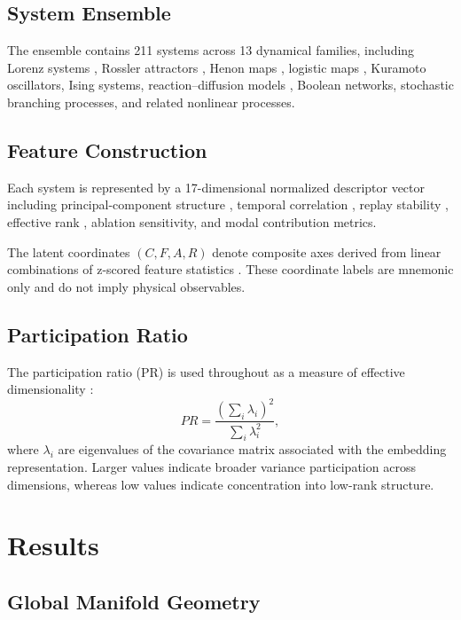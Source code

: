 \documentclass[%
 aip,
 chaos,
 amsmath,amssymb,
 reprint,
]{revtex4-2}
\begin{document}
\subsection{System Ensemble}

The ensemble contains 211 systems across 13 dynamical families, including Lorenz systems \cite{lorenz1963deterministic}, Rossler attractors \cite{rossler1976equation}, Henon maps \cite{henon1976two-dimensional}, logistic maps \cite{feigenbaum1978quantitative}, Kuramoto oscillators, Ising systems, reaction--diffusion models \cite{prigogine1968dissipative}, Boolean networks, stochastic branching processes, and related nonlinear processes.

\subsection{Feature Construction}

Each system is represented by a 17-dimensional normalized descriptor vector including principal-component structure \cite{broomhead1986extracting}, temporal correlation \cite{kantz1997nonlinear}, replay stability \cite{fraser1986independent}, effective rank \cite{roy1989effective, yang2018effective}, ablation sensitivity, and modal contribution metrics.

The latent coordinates $(C,F,A,R)$ denote composite axes derived from linear combinations of z-scored feature statistics \cite{amari2016information}. These coordinate labels are mnemonic only and do not imply physical observables.

\subsection{Participation Ratio}

The participation ratio (PR) is used throughout as a measure of effective dimensionality \cite{roy1989effective}:
\[
PR = \frac{\left(\sum_i \lambda_i\right)^2}{\sum_i \lambda_i^2},
\]
where $\lambda_i$ are eigenvalues of the covariance matrix associated with the embedding representation. Larger values indicate broader variance participation across dimensions, whereas low values indicate concentration into low-rank structure.

\section{Results}

\subsection{Global Manifold Geometry}
\end{document}
